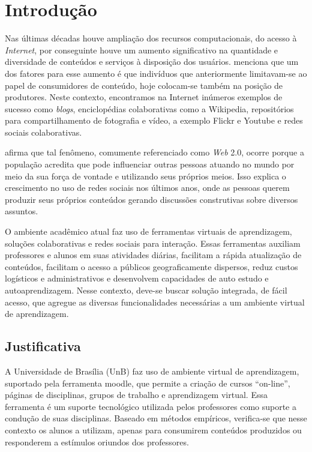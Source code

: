 \chapter{Introdução}
\label{cap-introducao}

Nas últimas décadas houve ampliação dos recursos computacionais, do acesso à \textit{Internet}, por conseguinte houve um aumento significativo na quantidade e diversidade de conteúdos e serviços à disposição dos usuários.  menciona que um dos fatores para esse aumento é que indivíduos que anteriormente limitavam-se ao papel de consumidores de conteúdo, hoje colocam-se também na posição de produtores. Neste contexto, encontramos na Internet inúmeros exemplos de sucesso como \textit{blogs}, enciclopédias colaborativas como a Wikipedia, repositórios para compartilhamento de fotografia e vídeo, a exemplo Flickr e Youtube e redes sociais colaborativas.

 afirma que tal fenômeno, comumente referenciado como \textit{Web} 2.0, ocorre porque a população acredita que pode influenciar outras pessoas atuando no mundo por meio da sua força de vontade e utilizando seus próprios meios. Isso explica o crescimento no uso de redes sociais nos últimos anos, onde as pessoas querem produzir seus próprios conteúdos gerando discussões construtivas sobre diversos assuntos.


O ambiente acadêmico atual faz uso de ferramentas virtuais de aprendizagem, soluções colaborativas e redes sociais para interação. Essas ferramentas auxiliam professores e alunos em suas atividades diárias, facilitam a rápida atualização de conteúdos, facilitam o acesso a públicos geograficamente dispersos, reduz custos logísticos e administrativos e desenvolvem capacidades de auto estudo e autoaprendizagem. Nesse contexto, deve-se buscar solução integrada, de fácil acesso, que agregue  as diversas funcionalidades necessárias a um ambiente virtual de aprendizagem.

\section{Justificativa}

A Universidade de Brasília (UnB) faz uso de ambiente virtual de aprendizagem, suportado pela ferramenta moodle, que permite a criação de cursos ``on-line'', páginas de disciplinas, grupos de trabalho e aprendizagem virtual. Essa ferramenta é um suporte tecnológico utilizada pelos professores como suporte a condução de suas disciplinas. Baseado em métodos empíricos, verifica-se que nesse contexto os alunos a utilizam, apenas para consumirem conteúdos produzidos ou responderem a estímulos oriundos dos professores.

